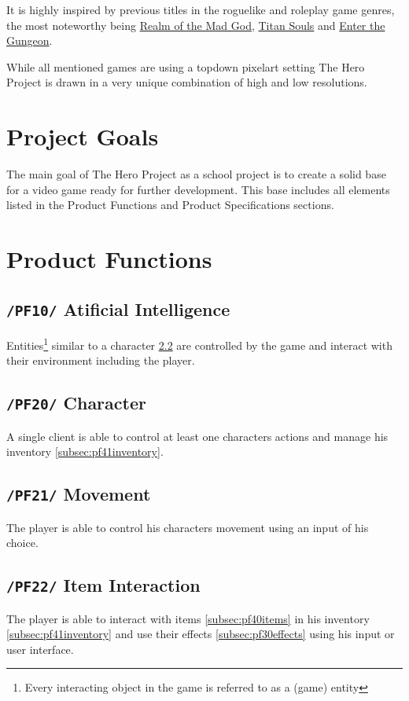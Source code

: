 \documentclass[11pt]{article}
\begin{document}
It is highly inspired by previous titles in the roguelike and roleplay game genres, the most noteworthy being \href{https://realmofthemadgod.com}{Realm of the Mad God}, \href{http://www.devolverdigital.com/games/view/titan-souls}{Titan Souls} and \href{http://dodgeroll.com/gungeon/}{Enter the Gungeon}.

While all mentioned games are using a topdown pixelart setting The Hero Project is drawn in a very unique combination of high and low resolutions.

\section{Project Goals}
The main goal of The Hero Project as a school project is to create a solid base for a video game ready for further development.
This base includes all elements listed in the Product Functions and Product Specifications sections.

\newpage

\section{Product Functions}
\subsection{\texttt{/PF10/} Atificial Intelligence}\label{subsec:pf10ai}
Entities\footnote[1]{Every interacting object in the game is referred to as a (game) entity} similar to a character \ref{subsec:pf20character} are controlled by the game and interact with their environment including the player.
\subsection{\texttt{/PF20/} Character}\label{subsec:pf20character}
A single client is able to control at least one characters actions and manage his inventory \ref{subsec:pf41inventory}.
\subsection{\texttt{/PF21/} Movement}\label{susec:pf21movement}
The player is able to control his characters movement using an input of his choice.
\subsection{\texttt{/PF22/} Item Interaction}\label{subsec:pf22iteminteraction}
The player is able to interact with items \ref{subsec:pf40items} in his inventory \ref{subsec:pf41inventory} and use their effects \ref{subsec:pf30effects} using his input or user interface.
\end{document}

